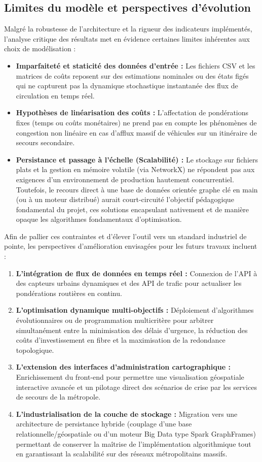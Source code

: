 \subsection{Limites du modèle et perspectives d'évolution}
Malgré la robustesse de l'architecture et la rigueur des indicateurs implémentés, l'analyse critique des résultats met en évidence certaines limites inhérentes aux choix de modélisation :
\begin{itemize}
    \item \textbf{Imparfaiteté et staticité des données d'entrée :} Les fichiers CSV et les matrices de coûts reposent sur des estimations nominales ou des états figés qui ne capturent pas la dynamique stochastique instantanée des flux de circulation en temps réel.
    \item \textbf{Hypothèses de linéarisation des coûts :} L'affectation de pondérations fixes (temps ou coûts monétaires) ne prend pas en compte les phénomènes de congestion non linéaire en cas d'afflux massif de véhicules sur un itinéraire de secours secondaire.
    \item \textbf{Persistance et passage à l'échelle (Scalabilité) :} Le stockage sur fichiers plats et la gestion en mémoire volatile (via NetworkX) ne répondent pas aux exigences d'un environnement de production hautement concurrentiel. Toutefois, le recours direct à une base de données orientée graphe clé en main (ou à un moteur distribué) aurait court-circuité l'objectif pédagogique fondamental du projet, ces solutions encapsulant nativement et de manière opaque les algorithmes fondamentaux d'optimisation.
\end{itemize}

Afin de pallier ces contraintes et d'élever l'outil vers un standard industriel de pointe, les perspectives d'amélioration envisagées pour les futurs travaux incluent :
\begin{enumerate}
    \item \textbf{L'intégration de flux de données en temps réel :} Connexion de l'API à des capteurs urbains dynamiques et des API de trafic pour actualiser les pondérations routières en continu.
    \item \textbf{L'optimisation dynamique multi-objectifs :} Déploiement d'algorithmes évolutionnaires ou de programmation multicritère pour arbitrer simultanément entre la minimisation des délais d'urgence, la réduction des coûts d'investissement en fibre et la maximisation de la redondance topologique.
    \item \textbf{L'extension des interfaces d'administration cartographique :} Enrichissement du front-end pour permettre une visualisation géospatiale interactive avancée et un pilotage direct des scénarios de crise par les services de secours de la métropole.
    \item \textbf{L'industrialisation de la couche de stockage :} Migration vers une architecture de persistance hybride (couplage d'une base relationnelle/géospatiale ou d'un moteur Big Data type Spark GraphFrames) permettant de conserver la maîtrise de l'implémentation algorithmique tout en garantissant la scalabilité sur des réseaux métropolitains massifs.
\end{enumerate}